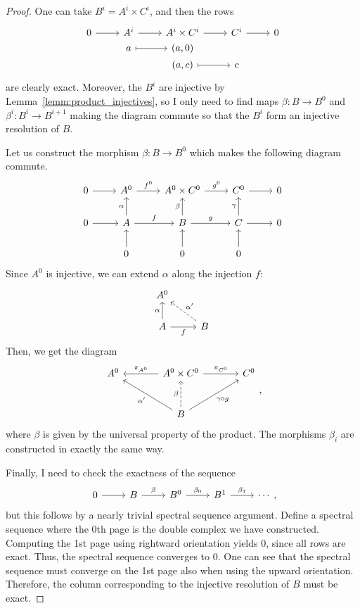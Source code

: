 \begin{proof}
  One can take $B^{i}=A^{i}\times C^{i}$, and then the rows
  \[\begin{tikzcd}[row sep=0]
      0\rar & A^{i}\rar & A^{i}\times C^{i}\rar & C^{i}\rar & 0 \\
      & a\rar[mapsto] & (a, 0) && \\
      && (a, c)\rar[mapsto] & c &
    \end{tikzcd}\]
  are clearly exact. Moreover, the $B^{i}$ are injective by
  Lemma~\ref{lemm:product_injectives}, so I only need to find maps
  $\beta:B\to B^{0}$ and $\beta^{i}:B^{i}\to B^{i+1}$ making the diagram
  commute so that the $B^{i}$ form an injective resolution of $B$.

  Let us construct the morphism $\beta:B\to B^{0}$ which makes the following diagram commute.
  \[\begin{tikzcd}
      0\rar & A^{0}\rar{f^{0}} & A^{0}\times C^{0}\rar{g^{0}} & C^{0}\rar & 0 \\
      0\rar & A\rar{f}\uar{\alpha} & B\rar{g}\uar{\beta}
      & C\rar\uar{\gamma} & 0 \\ & 0\uar & 0\uar & 0\uar &
    \end{tikzcd}\]
  Since $A^{0}$ is injective, we can extend $\alpha$ along the injection $f$:
  \[\begin{tikzcd}
      A^{0} & \\ A\arrow[r, "f"']\uar{\alpha}
      & B\arrow[ul, dashed, "\alpha^{\prime}"']
    \end{tikzcd}\]
  Then, we get the diagram
  \[\begin{tikzcd}[row sep=large, column sep=large]
      A^{0} & A^{0}\times C^{0}\arrow[l, "\pi_{A^{0}}"']\rar{\pi_{C^{0}}}
      & C^{0} \\ & B\ular{\alpha^{\prime}}\uar[dashed]{\beta}
      \arrow[ur, "\gamma\circ g"']
    \end{tikzcd},\]
  where $\beta$ is given by the universal property of the product.
  The morphisms $\beta_{i}$ are constructed in exactly the same way.

  Finally, I need to check the exactness of the sequence
  \[\begin{tikzcd}
      0\rar & B\rar{\beta} & B^{0}\rar{\beta_{0}} & B^{1}\rar{\beta_{1}} & \cdots
    \end{tikzcd},\]
  but this follows by a nearly trivial spectral sequence argument.
  Define a spectral sequence where the 0th page is the double complex we have
  constructed. Computing the 1st page using rightward orientation yields 0,
  since all rows are exact. Thus, the spectral sequence converges to 0.
  One can see that the spectral sequence must converge on the 1st page
  also when using the upward orientation. Therefore, the column corresponding
  to the injective resolution of $B$ must be exact.
\end{proof}
